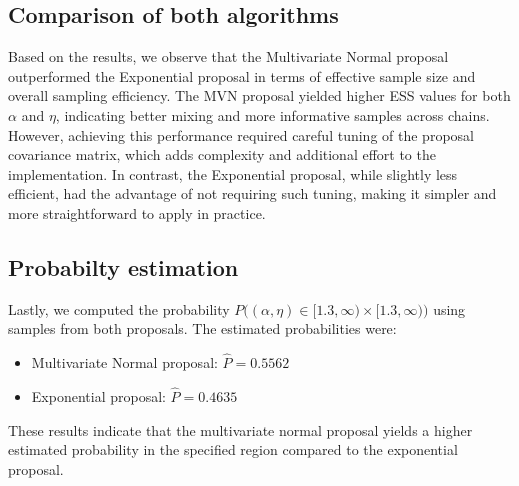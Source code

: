 \documentclass[9pt]{IEEEtran}
\begin{document}
\subsection{Comparison of both algorithms}

Based on the results, we observe that the Multivariate Normal proposal outperformed the 
Exponential proposal in terms of effective sample size and overall sampling efficiency. 
The MVN proposal yielded higher ESS values for both $\alpha$ and $\eta$, indicating better mixing 
and more informative samples across chains. However, achieving this performance required careful 
tuning of the proposal covariance matrix, which adds complexity and additional effort to the 
implementation. In contrast, the Exponential proposal, while slightly less efficient, 
had the advantage of not requiring such tuning, making it simpler and more straightforward to apply 
in practice.



\subsection{Probabilty estimation}
Lastly, we computed the probability \(P\big((\alpha, \eta) \in [1.3, \infty) \times [1.3, \infty)\big)\) using samples from both proposals. The estimated probabilities were:

\begin{itemize}
    \item Multivariate Normal proposal: \(\hat{P} = 0.5562\)
    \item Exponential proposal: \(\hat{P} = 0.4635\)
\end{itemize}

These results indicate that the multivariate normal proposal yields a higher estimated probability in the specified region compared to the exponential proposal.
\end{document}
